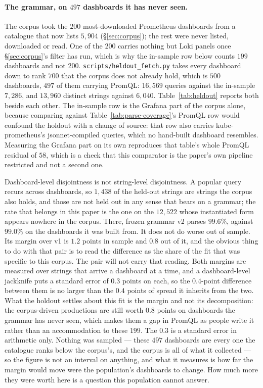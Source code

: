 \paragraph{The grammar, on $497$ dashboards it has never seen.}
The corpus took the $200$ most-downloaded Prometheus dashboards from a catalogue that
now lists $5{,}904$ (\S\ref{sec:corpus}); the rest were never listed, downloaded or read.
One of the $200$ carries nothing but Loki panels once \S\ref{sec:corpus}'s filter has
run, which is why the in-sample row below counts $199$ dashboards and not $200$.
\texttt{scripts/heldout\_fetch.py} takes every dashboard down to rank $700$ that the
corpus does not already hold, which is $500$ dashboards, $497$ of them carrying PromQL:
$16{,}569$ queries against the in-sample $7{,}286$, and $13{,}960$ distinct strings
against $6{,}040$. Table~\ref{tab:heldout} reports both beside each other. The in-sample
row is the Grafana part of the corpus alone, because comparing against
Table~\ref{tab:parse-coverage}'s PromQL row would confound the holdout with a change of
source: that row also carries kube-prometheus's jsonnet-compiled queries, which no
hand-built dashboard resembles. Measuring the Grafana part on its own reproduces that
table's whole PromQL residual of $58$, which is a check that this comparator is the
paper's own pipeline restricted and not a second one.

Dashboard-level disjointness is not string-level disjointness. A popular query recurs
across dashboards, so $1{,}438$ of the held-out strings are strings the corpus also
holds, and those are not held out in any sense that bears on a grammar; the rate that
belongs in this paper is the one on the $12{,}522$ whose instantiated form appears
nowhere in the corpus. There, frozen grammar v2 parses $99.6\%$, against $99.0\%$ on the
dashboards it was built from. It does not do worse out of sample. Its margin over v1 is
$1.2$ points in sample and $0.8$ out of it, and the obvious thing to do with that pair is
to read the difference as the share of the fit that was specific to this corpus. The pair
will not carry that reading. Both margins are measured over strings that arrive a
dashboard at a time, and a dashboard-level jackknife puts a standard error of $0.3$
points on each, so the $0.4$-point difference between them is no larger than the $0.4$
points of spread it inherits from the two. What the holdout settles about this fit is
the margin and not its decomposition: the corpus-driven productions are still worth
$0.8$ points on dashboards the grammar has never seen, which makes them a gap in PromQL
as people write it rather than an accommodation to these $199$. The $0.3$ is a standard
error in arithmetic only. Nothing was sampled --- these $497$ dashboards are every one
the catalogue ranks below the corpus's, and the corpus is all of what it collected ---
so the figure is not an interval on anything, and what it measures is how far the margin
would move were the population's dashboards to change. How much more
they were worth here is a question this population cannot answer.

